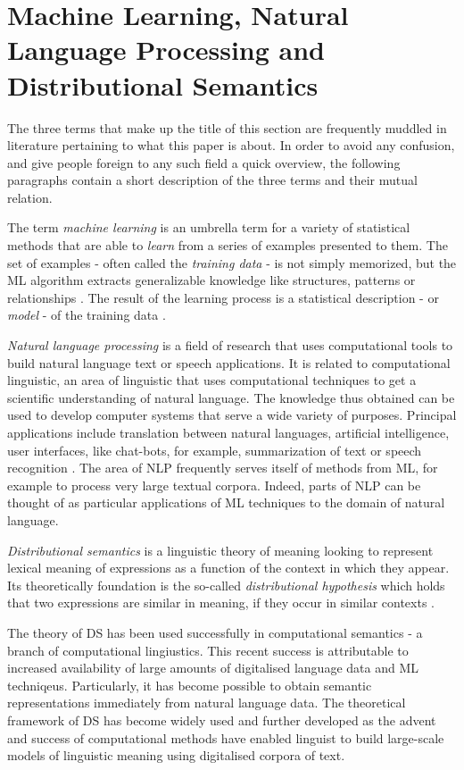 \documentclass{article}
\begin{document}
\section{Machine Learning, Natural Language Processing and Distributional Semantics}\hypertarget{sec2}{ }
The three terms that make up the title of this section are frequently muddled in literature pertaining to what this paper is about. In order to avoid any confusion, and give people foreign to any such field a quick overview, the following paragraphs contain a short description of the three terms and their mutual relation.
 
The term \emph{machine learning} is an umbrella term for a variety of statistical methods that are able to \emph{learn} from a series of examples presented to them. The set of examples - often called the \emph{training data} - is not simply memorized, but the ML algorithm extracts generalizable knowledge like structures, patterns or relationships \cite{domingos2012few}.
The result of the learning process is a statistical description - or \emph{model} - of the training data \cite{fayyad2001digital}.

\emph{Natural language processing} is a field of research that uses computational tools to build natural language text or speech applications. It is related to computational linguistic, an area of linguistic that uses computational techniques to get a scientific understanding of natural language. The knowledge thus obtained can be used  to develop computer systems that serve a wide variety of purposes. Principal applications include translation between natural languages, artificial intelligence, user interfaces, like chat-bots, for example, summarization of text or speech recognition \cite{chowdhury2003natural}. The area of NLP frequently serves itself of methods from ML, for example to process very large textual corpora. Indeed, parts of NLP can be thought of as particular applications of ML techniques to the domain of natural language.

\emph{Distributional semantics} is a linguistic theory of meaning looking to represent lexical meaning of expressions as a function of the context in which they appear. Its theoretically foundation is the so-called \emph{distributional hypothesis} which holds that two expressions are similar in meaning, if they occur in similar contexts \cite{harris1954distributional}.

The theory of DS has been used successfully in computational semantics - a branch of computational lingiustics. This recent success is attributable to increased availability of large amounts of digitalised language data and ML techniqeus. Particularly, it has become possible to obtain semantic representations immediately from natural language data. The theoretical framework of DS has become widely used and further developed as the advent and success of computational methods have enabled linguist to build large-scale models of linguistic meaning using digitalised corpora of text. 
\end{document}
